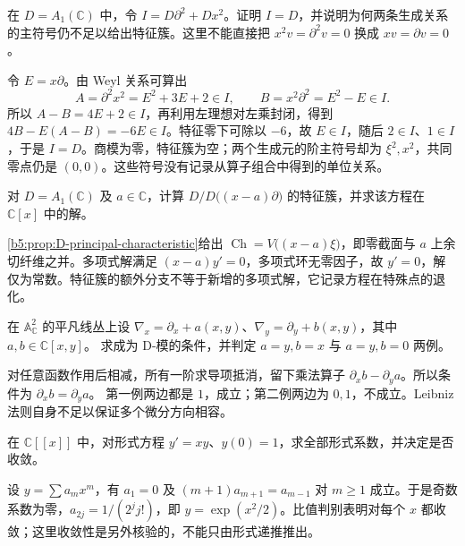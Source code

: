 \begin{exercise}
	在 \(D=A_1(\mathbb C)\) 中，令 \(I=D\partial^2+Dx^2\)。证明 \(I=D\)，并说明为何两条生成关系的主符号仍不足以给出特征簇。这里不能直接把 \(x^2v=\partial^2v=0\) 换成 \(xv=\partial v=0\)。
\end{exercise}
\begin{solution}
	令 \(E=x\partial\)。由 Weyl 关系可算出
	\[
		A=\partial^2x^2=E^2+3E+2\in I,\qquad B=x^2\partial^2=E^2-E\in I.
	\]
	所以 \(A-B=4E+2\in I\)，再利用左理想对左乘封闭，得到 \(4B-E(A-B)=-6E\in I\)。特征零下可除以 \(-6\)，故 \(E\in I\)，随后 \(2\in I\)、\(1\in I\)，于是 \(I=D\)。商模为零，特征簇为空；两个生成元的阶主符号却为 \(\xi^2,x^2\)，共同零点仍是 \((0,0)\)。这些符号没有记录从算子组合中得到的单位关系。
\end{solution}

\begin{exercise}
	对 \(D=A_1(\mathbb C)\) 及 \(a\in\mathbb C\)，计算 \(D/D\bigl((x-a)\partial\bigr)\) 的特征簇，并求该方程在 \(\mathbb C[x]\) 中的解。
\end{exercise}
\begin{solution}
	\cref{b5:prop:D-principal-characteristic}给出 \(\operatorname{Ch}=V\bigl((x-a)\xi\bigr)\)，即零截面与 \(a\) 上余切纤维之并。多项式解满足 \((x-a)y'=0\)，多项式环无零因子，故 \(y'=0\)，解仅为常数。特征簇的额外分支不等于新增的多项式解，它记录方程在特殊点的退化。
\end{solution}

\begin{exercise}
	在 \(\mathbb A^2_\mathbb C\) 的平凡线丛上设 \(\nabla_x=\partial_x+a(x,y)\)、\(\nabla_y=\partial_y+b(x,y)\)，其中 \(a,b\in\mathbb C[x,y]\)。 求成为 D-模的条件，并判定 \(a=y,b=x\) 与 \(a=y,b=0\) 两例。
\end{exercise}
\begin{solution}
	对任意函数作用后相减，所有一阶求导项抵消，留下乘法算子 \(\partial_xb-\partial_ya\)。所以条件为 \(\partial_xb=\partial_ya\)。 第一例两边都是 \(1\)，成立；第二例两边为 \(0,1\)，不成立。Leibniz 法则自身不足以保证多个微分方向相容。
\end{solution}

\begin{exercise}
	在 \(\mathbb C[\![x]\!]\) 中，对形式方程 \(y'=xy\)、\(y(0)=1\)，求全部形式系数，并决定是否收敛。
\end{exercise}
\begin{solution}
	设 \(y=\sum a_mx^m\)，有 \(a_1=0\) 及 \((m+1)a_{m+1}=a_{m-1}\) 对 \(m\ge1\) 成立。于是奇数系数为零，\(a_{2j}=1/(2^jj!)\)，即 \(y=\exp(x^2/2)\)。比值判别表明对每个 \(x\) 都收敛；这里收敛性是另外核验的，不能只由形式递推推出。
\end{solution}

